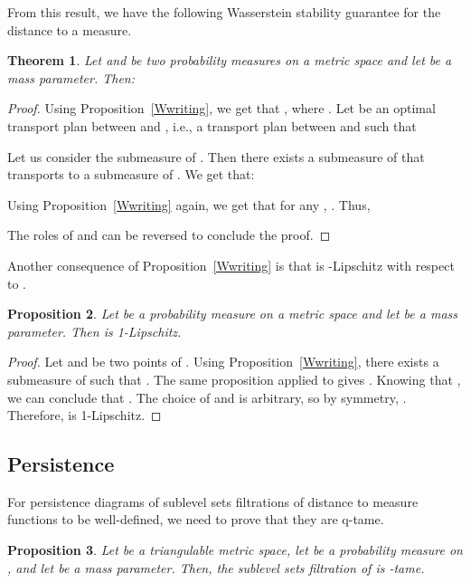 \documentclass[a4paper]{article}
\newtheorem{theorem}{Theorem}[section]
\newtheorem{proposition}[theorem]{Proposition}
\begin{document}
From this result, we have the following Wasserstein stability guarantee for the distance to a measure.

\begin{theorem}\label{stability}
Let  and  be two probability measures on a metric space  and let  be a mass parameter. 
Then:

\end{theorem}

\begin{proof}
Using Proposition~\ref{Wwriting}, we get that , where . 
Let  be an optimal transport plan between  and , i.e., a transport plan between  and  such that


Let us consider the submeasure  of .
Then there exists  a submeasure of  that transports  to a submeasure  of .
We get that:

Using Proposition~\ref{Wwriting} again, we get that for any , .
Thus,

The roles of  and  can be reversed to conclude the proof.
\end{proof}

Another consequence of Proposition~\ref{Wwriting} is that  is -Lipschitz with respect to .

\begin{proposition}\label{pLipschitz}
Let  be a probability measure on a metric space  and let  be a mass parameter. Then  is 1-Lipschitz.
\end{proposition}

\begin{proof}
Let  and  be two points of . 
Using Proposition~\ref{Wwriting}, there exists a submeasure  of  such that .
The same proposition applied to  gives .
Knowing that , we can conclude that .
The choice of  and  is arbitrary, so by symmetry, .
Therefore,  is 1-Lipschitz.
\end{proof}

\subsection{Persistence}
For persistence diagrams of sublevel sets filtrations of distance to measure functions to be well-defined, we need to prove that they are q-tame.
\begin{proposition}\label{pQtame}
Let  be a triangulable metric space, let  be a probability measure on , and let  be a mass parameter. 
Then, the sublevel sets filtration of  is -tame.
\end{proposition}
\end{document}
